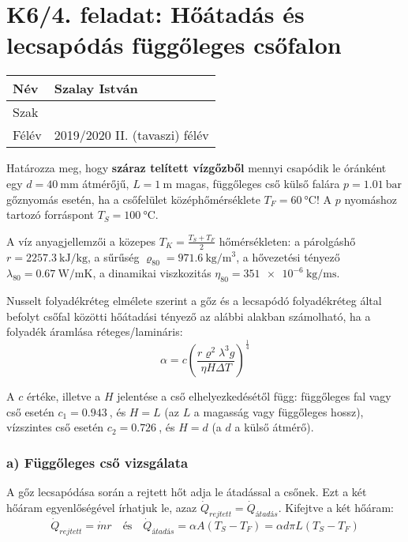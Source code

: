

\section*{K6/4. feladat: Hőátadás és lecsapódás függőleges csőfalon}

\begin{tabular}{ | p{2cm} | p{14cm} | } 
	\hline
	Név & Szalay István \\ 
	\hline
	Szak & \\ 
	\hline
	Félév & 2019/2020 II. (tavaszi) félév \\ 
	\hline
\end{tabular}
\vspace{0.5cm}

\noindent Határozza meg, hogy \textbf{száraz telített vízgőzből} mennyi csapódik le óránként egy $d = \SI{40}{\milli\meter}$ átmérőjű, $L = \SI{1}{\meter}$ magas, függőleges cső külső falára $p = \SI{1.01}{\bar}$ gőznyomás esetén, ha a csőfelület középhőmérséklete $T_F = \SI{60}{\celsius}$! A $p$ nyomáshoz tartozó forráspont $T_S = \SI{100}{\celsius}$.

A víz anyagjellemzői a közepes $T_K=\frac{T_S + T_F}{2}$ hőmérsékleten: a párolgáshő $r = \SI{2257.3}{\kilo\joule\per\kilogram}$, a sűrűség $\varrho_{80} = \SI{971.6}{\kilogram\per\meter\cubed}$, a hővezetési tényező $\lambda_{80} = \SI{0.67}{\watt\per\meter\kelvin}$, a dinamikai viszkozitás $\eta_{80} = \SI{351e-6}{\kilogram\per\meter\second}$.

\vspace{2mm}

Nusselt folyadékréteg elmélete szerint a gőz és a lecsapódó folyadékréteg által befolyt csőfal közötti hőátadási tényező az alábbi alakban számolható, ha a folyadék áramlása réteges/lamináris:
\vspace{-2mm}
\begin{equation}
	\alpha = c \left(\dfrac{r \varrho^2 \lambda^3 g}{\eta H \Delta T}\right)^{\tfrac{1}{4}}
\end{equation}

A $c$ értéke, illetve a $H$ jelentése a cső elhelyezkedésétől függ: függőleges fal vagy cső esetén $c_1 = \SI{0,943}{}$, és $H = L$ (az $L$ a magasság vagy függőleges hossz), vízszintes cső esetén $c_2 = \SI{0,726}{}$, és $H = d$ (a $d$ a külső átmérő).

\subsubsection*{a) Függőleges cső vizsgálata}
A gőz lecsapódása során a rejtett hőt adja le átadással a csőnek. Ezt a két hőáram egyenlőségével írhatjuk le, azaz $\dot{Q}_{\textit{rejtett}} = \dot{Q}_{\textit{átadás}}$. Kifejtve a két hőáram:
\begin{equation}
	\dot{Q}_{\textit{rejtett}} = \dot{m}r \quad \textrm{és} \quad \dot{Q}_{\textit{átadás}} = \alpha A \left(T_S - T_F\right) = \alpha d \pi L \left(T_S - T_F\right)
\end{equation}

